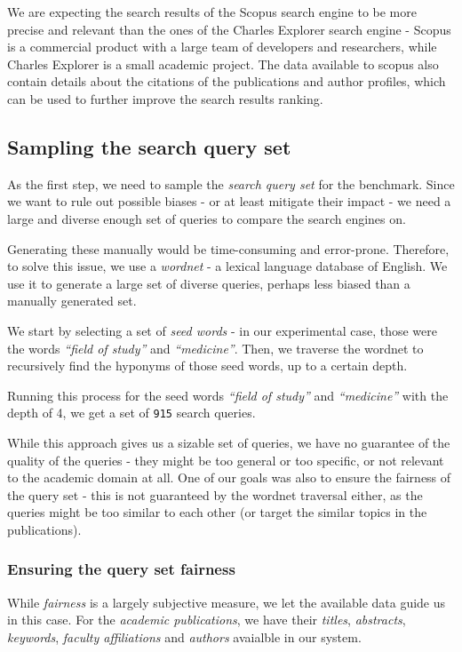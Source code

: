 We are expecting the search results of the Scopus search engine to be more precise and relevant than the ones of the Charles Explorer search engine -
Scopus is a commercial product with a large team of developers and researchers, while Charles Explorer is a small academic project.
The data available to scopus also contain details about the citations of the publications and author profiles, which can be used to further improve the search results ranking.

\subsection{Sampling the search query set}

As the first step, we need to sample the \textit{search query set} for the benchmark. 
Since we want to rule out possible biases - or at least mitigate their impact - we need a large and diverse enough set of queries to compare the search engines on.

Generating these manually would be time-consuming and error-prone. 
Therefore, to solve this issue, we use a \textit{wordnet} - a lexical language database of English.
We use it to generate a large set of diverse queries, perhaps less biased than a manually generated set.

We start by selecting a set of \textit{seed words} - in our experimental case, those were the words \textit{``field of study''} and \textit{``medicine''}.
Then, we traverse the wordnet to recursively find the hyponyms of those seed words, up to a certain depth.

Running this process for the seed words \textit{``field of study''} and \textit{``medicine''} with the depth of 4, we get a set of \texttt{915} search queries.

While this approach gives us a sizable set of queries, we have no guarantee of the quality of the queries - they might be too general or too specific, or not relevant to the academic domain at all.
One of our goals was also to ensure the fairness of the query set - this is not guaranteed by the wordnet traversal either, as the queries might be too similar to each other (or target the similar topics in the publications).

\subsubsection{Ensuring the query set fairness}

While \textit{fairness} is a largely subjective measure, we let the available data guide us in this case.
For the \textit{academic publications}, we have their \textit{titles}, \textit{abstracts}, \textit{keywords}, \textit{faculty affiliations} and \textit{authors} avaialble in our system.

